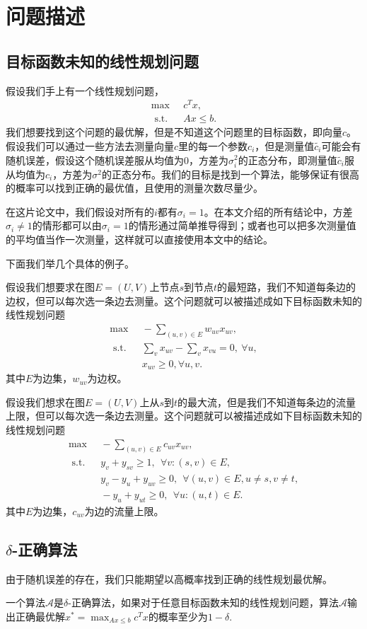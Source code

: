 \chapter{问题描述}
\section{目标函数未知的线性规划问题}
假设我们手上有一个线性规划问题，
\begin{align*}
\max &\ \ c^T x, \\
\textrm{ s.t. }& \ \ Ax \le b.
\end{align*}
我们想要找到这个问题的最优解，但是不知道这个问题里的目标函数，即向量$c$。假设我们可以通过一些方法去测量向量$c$里的每一个参数$c_i$，但是测量值$\tilde{c_i}$可能会有随机误差，假设这个随机误差服从均值为$0$，方差为$\sigma_i^2$的正态分布，即测量值$\tilde{c_i}$服从均值为$c_i$，方差为$\sigma^2$的正态分布。我们的目标是找到一个算法，能够保证有很高的概率可以找到正确的最优值，且使用的测量次数尽量少。

在这片论文中，我们假设对所有的$i$都有$\sigma_i=1$。在本文介绍的所有结论中，方差$\sigma_i\neq 1$的情形都可以由$\sigma_i=1$的情形通过简单推导得到；或者也可以把多次测量值的平均值当作一次测量，这样就可以直接使用本文中的结论。

下面我们举几个具体的例子。
\begin{example}[最短路问题]
假设我们想要求在图$E=(U,V)$上节点$s$到节点$t$的最短路，我们不知道每条边的边权，但可以每次选一条边去测量。这个问题就可以被描述成如下目标函数未知的线性规划问题
\begin{align*}
\max &\ \ -\sum_{(u,v)\in E} w_{uv} x_{uv},\\
\textrm{ s.t. }& \ \ \sum_v x_{uv} - \sum_v x_{vu} = 0, \ \forall u,\\
& \ \ x_{uv}\ge 0, \forall u,v.
\end{align*}
其中$E$为边集，$w_{uv}$为边权。
\end{example}

\begin{example}[最大流问题]
假设我们想求在图$E=(U,V)$上从$s$到$t$的最大流，但是我们不知道每条边的流量上限，但可以每次选一条边去测量。这个问题就可以被描述成如下目标函数未知的线性规划问题
\begin{align*}
\max &\ \ -\sum_{(u,v)\in E} c_{uv}x_{uv}, \\
\textrm{ s.t. }& \ \  y_v + y_{sv} \ge 1, \ \ \forall v: (s,v)\in E,\\
& \ \ y_v -y_u +y_{uv} \ge 0, \ \ \forall(u,v)\in E, u\neq s, v\neq t,\\
& \ \ -y_u + y_{ut}\ge 0, \ \ \forall u: (u,t)\in E.
\end{align*}
其中$E$为边集，$c_{uv}$为边的流量上限。
\end{example}

\section{$\delta$-正确算法}
由于随机误差的存在，我们只能期望以高概率找到正确的线性规划最优解。
\begin{definition}
一个算法$\mathcal{A}$是$\delta$-正确算法，如果对于任意目标函数未知的线性规划问题，算法$\mathcal{A}$输出正确最优解$x^* = \max_{Ax\le b} c^T x$的概率至少为$1-\delta$.
\end{definition}


